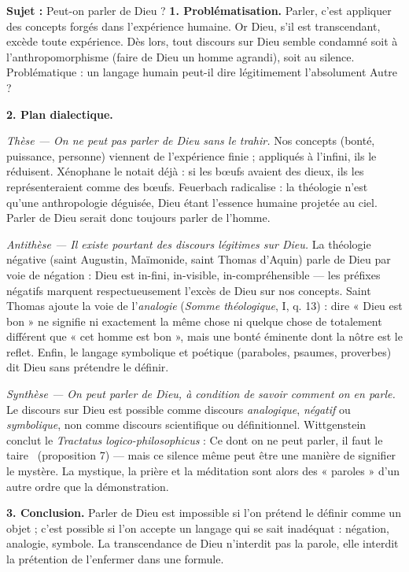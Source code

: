 \documentclass[11pt]{article}
\newcommand{\cle}[1]{{\popxbold\color{popdark}#1}}
\begin{document}
\begin{exoresolu}
\textbf{Sujet :} Peut-on parler de Dieu ?
\tcblower
\textbf{1. Problématisation.} Parler, c'est appliquer des concepts forgés dans l'expérience humaine. Or Dieu, s'il est \cle{transcendant}, excède toute expérience. Dès lors, tout discours sur Dieu semble condamné soit à l'anthropomorphisme (faire de Dieu un homme agrandi), soit au silence. Problématique : un langage humain peut-il dire légitimement l'absolument Autre ?

\textbf{2. Plan dialectique.}

\emph{Thèse — On ne peut pas parler de Dieu sans le trahir.} Nos concepts (bonté, puissance, personne) viennent de l'expérience finie ; appliqués à l'infini, ils le réduisent. Xénophane le notait déjà : si les bœufs avaient des dieux, ils les représenteraient comme des bœufs. Feuerbach radicalise : la théologie n'est qu'une anthropologie déguisée, Dieu étant l'essence humaine projetée au ciel. Parler de Dieu serait donc toujours parler de l'homme.

\emph{Antithèse — Il existe pourtant des discours légitimes sur Dieu.} La \cle{théologie négative} (saint Augustin, Maïmonide, saint Thomas d'Aquin) parle de Dieu par voie de négation : Dieu est in-fini, in-visible, in-compréhensible — les préfixes négatifs marquent respectueusement l'excès de Dieu sur nos concepts. Saint Thomas ajoute la voie de l'\emph{analogie} (\emph{Somme théologique}, I, q. 13) : dire « Dieu est bon » ne signifie ni exactement la même chose ni quelque chose de totalement différent que « cet homme est bon », mais une bonté éminente dont la nôtre est le reflet. Enfin, le langage symbolique et poétique (paraboles, psaumes, proverbes) dit Dieu sans prétendre le définir.

\emph{Synthèse — On peut parler de Dieu, à condition de savoir comment on en parle.} Le discours sur Dieu est possible comme discours \emph{analogique}, \emph{négatif} ou \emph{symbolique}, non comme discours scientifique ou définitionnel. Wittgenstein conclut le \emph{Tractatus logico-philosophicus} : \guillemotleft Ce dont on ne peut parler, il faut le taire \guillemotright\ (proposition 7) — mais ce silence même peut être une manière de signifier le mystère. La mystique, la prière et la méditation sont alors des « paroles » d'un autre ordre que la démonstration.

\textbf{3. Conclusion.} Parler de Dieu est impossible si l'on prétend le définir comme un objet ; c'est possible si l'on accepte un langage qui se sait inadéquat : négation, analogie, symbole. La transcendance de Dieu n'interdit pas la parole, elle interdit la prétention de l'enfermer dans une formule.
\end{exoresolu}
\end{document}
